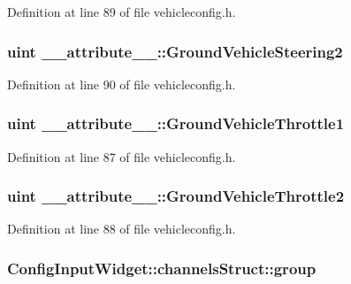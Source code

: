Definition at line 89 of file vehicleconfig.\-h.

\hypertarget{group___config_plugin_gab404016de72261d048356e628b9ef0b7}{
\subsubsection[{Ground\-Vehicle\-Steering2}]{\setlength{\rightskip}{0pt plus 5cm}uint \-\_\-\-\_\-attribute\-\_\-\-\_\-\-::\-Ground\-Vehicle\-Steering2}}\label{group___config_plugin_gab404016de72261d048356e628b9ef0b7}


Definition at line 90 of file vehicleconfig.\-h.

\hypertarget{group___config_plugin_ga755435654b7373fe879e991ccdd40757}{
\subsubsection[{Ground\-Vehicle\-Throttle1}]{\setlength{\rightskip}{0pt plus 5cm}uint \-\_\-\-\_\-attribute\-\_\-\-\_\-\-::\-Ground\-Vehicle\-Throttle1}}\label{group___config_plugin_ga755435654b7373fe879e991ccdd40757}


Definition at line 87 of file vehicleconfig.\-h.

\hypertarget{group___config_plugin_ga6a8ae4214756c689b83b9f42a56c2505}{
\subsubsection[{Ground\-Vehicle\-Throttle2}]{\setlength{\rightskip}{0pt plus 5cm}uint \-\_\-\-\_\-attribute\-\_\-\-\_\-\-::\-Ground\-Vehicle\-Throttle2}}\label{group___config_plugin_ga6a8ae4214756c689b83b9f42a56c2505}


Definition at line 88 of file vehicleconfig.\-h.

\hypertarget{group___config_plugin_gaebb67a5da44805269356236983a8c2d2}{
\subsubsection[{group}]{ Config\-Input\-Widget\-::channels\-Struct\-::group}}\label{group___config_plugin_gaebb67a5da44805269356236983a8c2d2}


